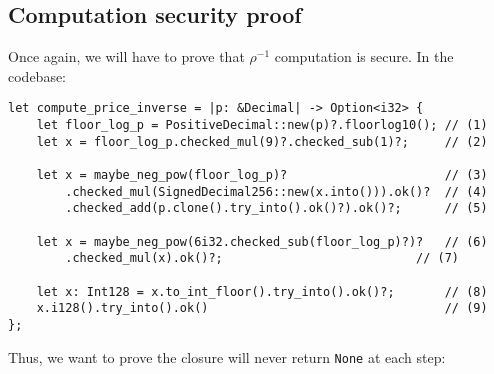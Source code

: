 \documentclass[11pt]{article}
\begin{document}
\subsection{Computation security proof}
Once again, we will have to prove that $\rho^{-1}$ computation is secure.
In the codebase:

\begin{verbatim}
let compute_price_inverse = |p: &Decimal| -> Option<i32> {
    let floor_log_p = PositiveDecimal::new(p)?.floorlog10(); // (1)
    let x = floor_log_p.checked_mul(9)?.checked_sub(1)?;     // (2)

    let x = maybe_neg_pow(floor_log_p)?                      // (3)
        .checked_mul(SignedDecimal256::new(x.into())).ok()?  // (4)
        .checked_add(p.clone().try_into().ok()?).ok()?;      // (5)

    let x = maybe_neg_pow(6i32.checked_sub(floor_log_p)?)?   // (6)
	    .checked_mul(x).ok()?;                           // (7)

    let x: Int128 = x.to_int_floor().try_into().ok()?;       // (8)
    x.i128().try_into().ok()                                 // (9)
};
\end{verbatim}
Thus, we want to prove the closure will never return \texttt{None} at
each step:
\end{document}
